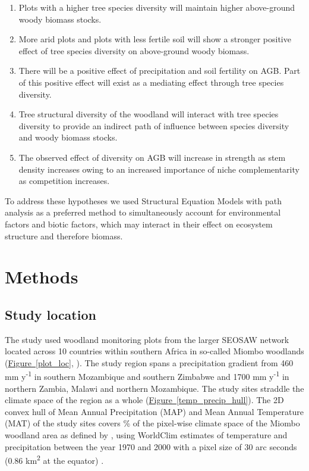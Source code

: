 \documentclass[11pt,a4paper]{article}
\begin{document}
\begin{enumerate}
	\item{Plots with a higher tree species diversity will maintain higher above-ground woody biomass stocks.}
	\item{More arid plots and plots with less fertile soil will show a stronger positive effect of tree species diversity on above-ground woody biomass.} 
	\item{There will be a positive effect of precipitation and soil fertility on AGB. Part of this positive effect will exist as a mediating effect through tree species diversity.}
	\item{Tree structural diversity of the woodland will interact with tree species diversity to provide an indirect path of influence between species diversity and woody biomass stocks.}
	\item{The observed effect of diversity on AGB will increase in strength as stem density increases owing to an increased importance of niche complementarity as competition increases.}
\end{enumerate}

To address these hypotheses we used Structural Equation Models with path analysis as a preferred method to simultaneously account for environmental factors and biotic factors, which may interact in their effect on ecosystem structure and therefore biomass.

\section{Methods}

\subsection{Study location}

The study used \nplots{} woodland monitoring plots from the larger SEOSAW network \citep{seosaw_web} located across 10 countries within southern Africa in so-called Miombo woodlands (\hyperref[plot_loc]{Figure~\ref*{plot_loc}}, \citealt{White1987}). The study region spans a precipitation gradient from \textapprox{}460 mm y\textsuperscript{-1} in southern Mozambique and southern Zimbabwe and \textapprox{}1700 mm y\textsuperscript{-1} in northern Zambia, Malawi and northern Mozambique. The study sites straddle the climate space of the region as a whole (\hyperref[temp_precip_hull]{Figure~\ref*{temp_precip_hull}}). The 2D convex hull of Mean Annual Precipitation (MAP) and Mean Annual Temperature (MAT) of the study sites covers \hullcover{}\% of the pixel-wise climate space of the Miombo woodland area as defined by \citet{White1987}, using WorldClim estimates of temperature and precipitation between the year 1970 and 2000 with a pixel size of 30 arc seconds (0.86 km\textsuperscript{2} at the equator) \citep{Fick2017}. 
\end{document}
